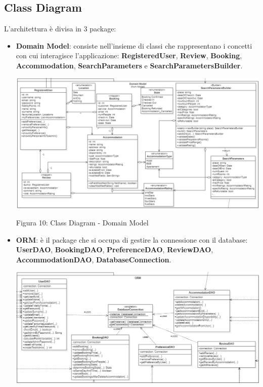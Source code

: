\documentclass[10pt]{article}
\begin{document}
\subsection{Class Diagram}
L'architettura è divisa in 3 package:
\begin{itemize}
\label{domainmodel}
\item \textbf{Domain Model}: consiste nell’insieme di classi che rappresentano i concetti con cui interagisce l’applicazione: \textbf{RegisteredUser}, \textbf{Review}, \textbf{Booking}, \textbf{Accommodation}, \textbf{SearchParameters} e \textbf{SearchParametersBuilder}.
\par\medskip
\hspace*{-1.5cm}
\includegraphics[scale=0.58]{uml/DomainModel}
\par\medskip
\begin{center}
Figura 10: Class Diagram - Domain Model 
\end{center}
\par\medskip
\vspace{-0.3cm}
\item \textbf{ORM}: è il package che si occupa di gestire la connessione con il database: \textbf{UserDAO}, \textbf{BookingDAO}, \textbf{PreferenceDAO}, \textbf{ReviewDAO}, \textbf{AccommodationDAO}, \textbf{DatabaseConnection}.
\par\medskip
\hspace*{-1.75cm}
\includegraphics[scale=0.58]{uml/DAO}

\end{itemize}
\end{document}
